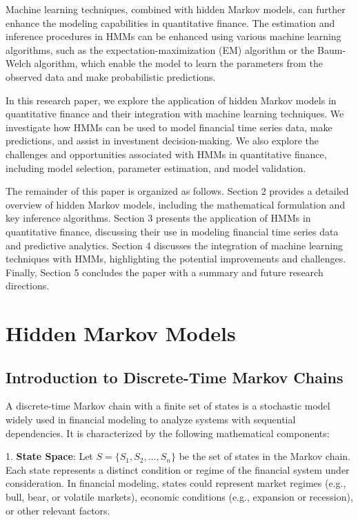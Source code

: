 \documentclass[a4paper,11pt]{article}
\begin{document}
Machine learning techniques, combined with hidden Markov models, can further enhance the modeling capabilities in quantitative finance. The estimation and inference procedures in HMMs can be enhanced using various machine learning algorithms, such as the expectation-maximization (EM) algorithm or the Baum-Welch algorithm, which enable the model to learn the parameters from the observed data and make probabilistic predictions.

In this research paper, we explore the application of hidden Markov models in quantitative finance and their integration with machine learning techniques. We investigate how HMMs can be used to model financial time series data, make predictions, and assist in investment decision-making. We also explore the challenges and opportunities associated with HMMs in quantitative finance, including model selection, parameter estimation, and model validation.

The remainder of this paper is organized as follows. Section 2 provides a detailed overview of hidden Markov models, including the mathematical formulation and key inference algorithms. Section 3 presents the application of HMMs in quantitative finance, discussing their use in modeling financial time series data and predictive analytics. Section 4 discusses the integration of machine learning techniques with HMMs, highlighting the potential improvements and challenges. Finally, Section 5 concludes the paper with a summary and future research directions.

\section{Hidden Markov Models}
\label{sec:HHMs}

\subsection{Introduction to Discrete-Time Markov Chains}
\label{sec:Intro-to-HHM}

A discrete-time Markov chain with a finite set of states is a stochastic model widely used in financial modeling to analyze systems with sequential dependencies. It is characterized by the following mathematical components:

1. \textbf{State Space}: Let $S = \{S_1, S_2, \ldots, S_n\}$ be the set of states in the Markov chain. Each state represents a distinct condition or regime of the financial system under consideration. In financial modeling, states could represent market regimes (e.g., bull, bear, or volatile markets), economic conditions (e.g., expansion or recession), or other relevant factors.
\end{document}
